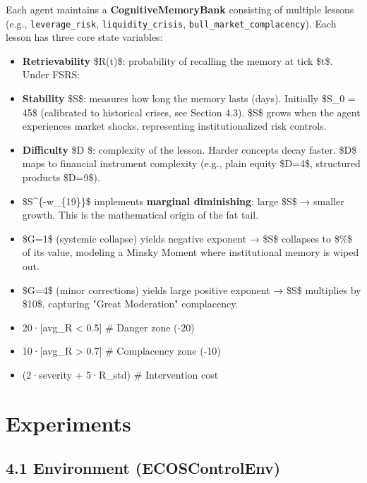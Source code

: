 \documentclass[11pt]{article}
\begin{document}
{{Each agent maintains a \textbf{CognitiveMemoryBank} consisting of multiple lessons (e.g., \texttt{leverage_risk}, \texttt{liquidity_crisis}, \texttt{bull_market_complacency}). Each lesson has three core state variables:
\begin{itemize}
  \item \textbf{Retrievability} \$R(t)\$: probability of recalling the memory at tick \$t\$. Under FSRS:
  \item \textbf{Stability} \$S\$: measures how long the memory lasts (days). Initially \$S\_0 = 45\$ (calibrated to historical crises, see Section 4.3). \$S\$ grows when the agent experiences market shocks, representing institutionalized risk controls.
  \item \textbf{Difficulty} \$D \in [1,10]\$: complexity of the lesson. Harder concepts decay faster. \$D\$ maps to financial instrument complexity (e.g., plain equity \$D=4\$, structured products \$D=9\$).
  \item \$S^\{-w\_\{19\}\}\$ implements \textbf{marginal diminishing}: large \$S\$ → smaller growth. This is the mathematical origin of the fat tail.
  \item \$G=1\$ (systemic collapse) yields negative exponent → \$S\$ collapses to \$\%\$ of its value, modeling a Minsky Moment where institutional memory is wiped out.
  \item \$G=4\$ (minor corrections) yields large positive exponent → \$S\$ multiplies by \$10\times\$, capturing "Great Moderation" complacency.
  \item 20·[avg\_R < 0.5]                          \# Danger zone (-20)
  \item 10·[avg\_R > 0.7]                          \# Complacency zone (-10)
  \item (2·severity + 5·R\_std)                    \# Intervention cost
\end{itemize}


\section{Experiments}
\subsection{4.1 Environment (ECOSControlEnv)}

}}
\end{document}
